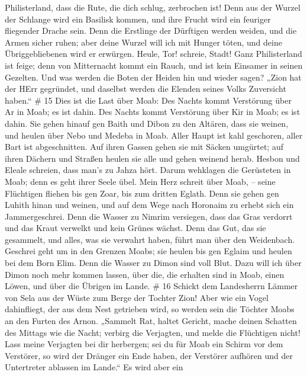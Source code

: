 Philisterland, dass die Rute, die dich schlug, zerbrochen ist! Denn aus
der Wurzel der Schlange wird ein Basilisk kommen, und ihre Frucht wird
ein feuriger fliegender Drache sein.  Denn die Erstlinge
der Dürftigen werden weiden, und die Armen sicher ruhen; aber deine
Wurzel will ich mit Hunger töten, und deine Übriggebliebenen wird er
erwürgen.  Heule, Tor! schreie, Stadt! Ganz Philisterland
ist feige; denn von Mitternacht kommt ein Rauch, und ist kein Einsamer
in seinen Gezelten.  Und was werden die Boten der Heiden
hin und wieder sagen? „Zion hat der HErr gegründet, und daselbst werden
die Elenden seines Volks Zuversicht haben.`` \# 15  Dies ist
die Last über Moab: Des Nachts kommt Verstörung über Ar in Moab; es ist
dahin. Des Nachts kommt Verstörung über Kir in Moab; es ist dahin.
 Sie gehen hinauf gen Baith und Dibon zu den Altären, dass
sie weinen, und heulen über Nebo und Medeba in Moab. Aller Haupt ist
kahl geschoren, aller Bart ist abgeschnitten.  Auf ihren
Gassen gehen sie mit Säcken umgürtet; auf ihren Dächern und Straßen
heulen sie alle und gehen weinend herab.  Hesbon und Eleale
schreien, dass man's zu Jahza hört. Darum wehklagen die Gerüsteten in
Moab; denn es geht ihrer Seele übel.  Mein Herz schreit über
Moab, -- seine Flüchtigen fliehen bis gen Zoar, bis zum dritten Eglath.
Denn sie gehen gen Luhith hinan und weinen, und auf dem Wege nach
Horonaim zu erhebt sich ein Jammergeschrei.  Denn die Wasser
zu Nimrim versiegen, dass das Gras verdorrt und das Kraut verwelkt und
kein Grünes wächst.  Denn das Gut, das sie gesammelt, und
alles, was sie verwahrt haben, führt man über den Weidenbach.
 Geschrei geht um in den Grenzen Moabs; sie heulen bis gen
Eglaim und heulen bei dem Born Elim.  Denn die Wasser zu
Dimon sind voll Blut. Dazu will ich über Dimon noch mehr kommen lassen,
über die, die erhalten sind in Moab, einen Löwen, und über die Übrigen
im Lande. \# 16  Schickt dem Landesherrn Lämmer von Sela aus
der Wüste zum Berge der Tochter Zion!  Aber wie ein Vogel
dahinfliegt, der aus dem Nest getrieben wird, so werden sein die Töchter
Moabs an den Furten des Arnon.  „Sammelt Rat, haltet
Gericht, mache deinen Schatten des Mittags wie die Nacht; verbirg die
Verjagten, und melde die Flüchtigen nicht!  Lass meine
Verjagten bei dir herbergen; sei du für Moab ein Schirm vor dem
Verstörer, so wird der Dränger ein Ende haben, der Verstörer aufhören
und der Untertreter ablassen im Lande.``  Es wird aber ein
